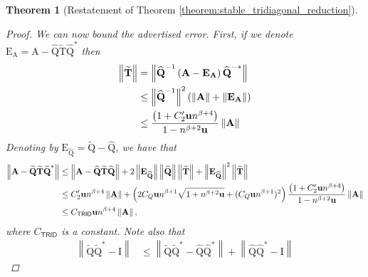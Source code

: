 \documentclass{article}
\newcommand{\lnorm}{\left\|}
\newcommand{\rnorm}{\right\|}
\newcommand{\lpar}{\left(}
\newcommand{\rpar}{\right)}
\newtheorem{theorem}{Theorem}[section]
\newcommand\matA{\boldsymbol{\mathrm{A}}}
\newcommand\matE{\boldsymbol{\mathrm{E}}}
\newcommand\matI{\boldsymbol{\mathrm{I}}}
\newcommand\matQtilde{\widetilde{\boldsymbol{\mathrm{Q}}}}
\newcommand\matTtilde{\widetilde{\boldsymbol{\mathrm{T}}}}
\newcommand\matQhat{\widehat{\boldsymbol{\mathrm{Q}}}}
\newcommand{\umach}{\textbf{\textup{u}}}
\newcommand{\TRID}{\mathsf{TRID}}
\newcommand{\cmm}{\beta}
\begin{document}
\begin{theorem}[Restatement of Theorem \ref{theorem:stable_tridiagonal_reduction}]
\begin{proof}
        We can now bound the advertised error. First, if we denote $\matE_{\matA}=\matA-\matQhat\matTtilde\matQhat^*$ then
        \begin{align*}
            \lnorm
                \matTtilde
            \rnorm
            &=
            \lnorm
                \matQhat^{-1}\lpar \matA-\matE_{\matA} \rpar \matQhat^{-*}
            \rnorm
            \\
            &\leq
            \lnorm
            \matQhat^{-1}
            \rnorm^2
            \lpar
                \lnorm \matA \rnorm + \lnorm \matE_{\matA} \rnorm
            \rpar
            \\
            &\leq
            \frac{\lpar
                1 + C_2'\umach n^{\cmm+4}
            \rpar}{1-n^{\cmm+2}\umach}
            \lnorm \matA \rnorm
        \end{align*}
        Denoting by $\matE_{\matQhat}=\matQtilde-\matQhat$, we have that
        \begin{align}
            \lnorm \matA-\matQtilde\matTtilde\matQtilde^* \rnorm
            &\leq
            \lnorm
                \matA-\matQhat\matTtilde\matQhat
            \rnorm
            +
            2\lnorm \matE_{\matQhat}\rnorm \lnorm \matQhat\rnorm
            \lnorm \matTtilde \rnorm
            +
            \lnorm \matE_{\matQhat} \rnorm^2
            \lnorm \matTtilde \rnorm
            \nonumber
            \\
            &\leq
            C_2'\umach n^{\cmm+4}
                \lnorm\matA\rnorm
            +
            \lpar
                2C_Q\umach n^{\cmm+1}
                \sqrt{1+n^{\cmm+2}\umach}
                +
                (C_Q\umach n^{\cmm+1})^2
            \rpar
            \frac{\lpar
                1 + C_2'\umach n^{\cmm+4}
            \rpar}{1-n^{\cmm+2}\umach}
            \lnorm \matA \rnorm
            \nonumber
            \\
            &\leq
            C_{\TRID}\umach n^{\cmm+4}
                \lnorm\matA\rnorm,
            \label{eq:theorem_tridiagonal_reduction_bound_q_tilde}
        \end{align}
        where $C_{\TRID}$ is a constant.
        Note also that
        \begin{align*}
            \lnorm
                \matQtilde\matQtilde^* - \matI
            \rnorm
            &\leq
            \lnorm
                \matQtilde\matQtilde^*-\matQhat\matQhat^*
            \rnorm
            +
            \lnorm
                \matQhat\matQhat^* - \matI
            \rnorm

\end{align*}
\end{proof}
\end{theorem}
\end{document}
